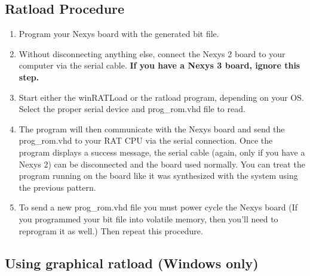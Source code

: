 \documentclass[notitlepage]{article}
\begin{document}
\subsection{Ratload Procedure}
\begin{enumerate}
\item Program your Nexys board with the generated bit file.

\item Without disconnecting anything else, connect the Nexys 2 board to your computer via the serial cable. \textbf{If you have a Nexys 3 board, ignore this step.}

\item Start either the winRATLoad or the ratload program, depending on your OS. Select the proper serial device and prog\_rom.vhd file to read.

\item The program will then communicate with the Nexys board and send the prog\_rom.vhd to your RAT CPU via the serial connection. Once the program displays a success message, the serial cable (again, only if you have a Nexys 2) can be disconnected and the board used normally. You can treat the program running on the board like it was synthesized with the system using the previous pattern.

\item To send a new prog\_rom.vhd file you must power cycle the Nexys board (If you programmed your bit file into volatile memory, then you'll need to reprogram it as well.) Then repeat this procedure.
\end{enumerate}

\subsection{Using graphical ratload (Windows only)}
\end{document}
